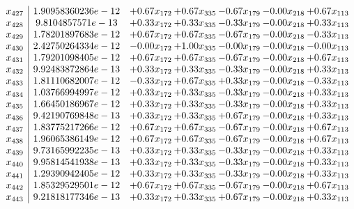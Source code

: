 \documentclass[8pt]{article}
\begin{document}
\[\begin{array}{c| c c@{\hskip 2pt} c@{\hskip 2pt} c@{\hskip 2pt} c@{\hskip 2pt} c@{\hskip 2pt} }
 x_{427}   &  1.90958360236e-12 & +  0.67 x_{172} & +  0.67 x_{335} & -0.67 x_{179} & -0.00 x_{218} & +  0.67 x_{113}\\
 x_{428}   &  9.8104857571e-13 & +  0.33 x_{172} & +  0.33 x_{335} & -0.33 x_{179} & -0.00 x_{218} & +  0.33 x_{113}\\
 x_{429}   &  1.78201897683e-12 & +  0.67 x_{172} & +  0.67 x_{335} & -0.67 x_{179} & -0.00 x_{218} & -0.33 x_{113}\\
 x_{430}   &  2.42750264334e-12 & -0.00 x_{172} & +  1.00 x_{335} & -0.00 x_{179} & -0.00 x_{218} & -0.00 x_{113}\\
 x_{431}   &  1.79201098405e-12 & +  0.67 x_{172} & +  0.67 x_{335} & -0.67 x_{179} & -0.00 x_{218} & +  0.67 x_{113}\\
 x_{432}   &  9.92483872864e-13 & +  0.33 x_{172} & +  0.33 x_{335} & -0.33 x_{179} & -0.00 x_{218} & +  0.33 x_{113}\\
 x_{433}   &  1.81110682007e-12 & -0.33 x_{172} & +  0.67 x_{335} & +  0.33 x_{179} & -0.00 x_{218} & -0.33 x_{113}\\
 x_{434}   &  1.03766994997e-12 & +  0.33 x_{172} & +  0.33 x_{335} & -0.33 x_{179} & -0.00 x_{218} & +  0.33 x_{113}\\
 x_{435}   &  1.66450186967e-12 & +  0.33 x_{172} & +  0.33 x_{335} & -0.33 x_{179} & -0.00 x_{218} & +  0.33 x_{113}\\
 x_{436}   &  9.42190769848e-13 & +  0.33 x_{172} & +  0.33 x_{335} & +  0.67 x_{179} & -0.00 x_{218} & +  0.33 x_{113}\\
 x_{437}   &  1.83775217266e-12 & +  0.67 x_{172} & +  0.67 x_{335} & -0.67 x_{179} & -0.00 x_{218} & +  0.67 x_{113}\\
 x_{438}   &  1.96065386149e-12 & +  0.67 x_{172} & +  0.67 x_{335} & -0.67 x_{179} & -0.00 x_{218} & +  0.67 x_{113}\\
 x_{439}   &  9.73165992235e-13 & +  0.33 x_{172} & +  0.33 x_{335} & -0.33 x_{179} & -0.00 x_{218} & +  0.33 x_{113}\\
 x_{440}   &  9.95814541938e-13 & +  0.33 x_{172} & +  0.33 x_{335} & -0.33 x_{179} & -0.00 x_{218} & +  0.33 x_{113}\\
 x_{441}   &  1.29390942405e-12 & +  0.33 x_{172} & +  0.33 x_{335} & -0.33 x_{179} & -0.00 x_{218} & +  0.33 x_{113}\\
 x_{442}   &  1.85329529501e-12 & +  0.67 x_{172} & +  0.67 x_{335} & -0.67 x_{179} & -0.00 x_{218} & +  0.67 x_{113}\\
 x_{443}   &  9.21818177346e-13 & +  0.33 x_{172} & +  0.33 x_{335} & +  0.67 x_{179} & -0.00 x_{218} & +  0.33 x_{113}\\

\end{array}\]
\end{document}
